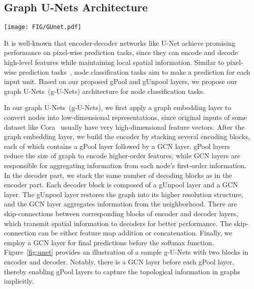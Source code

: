 \documentclass{article}
\begin{document}
\subsection{Graph U-Nets Architecture}\label{sec:gunet}

\begin{figure*}[t] \texttt{[image: FIG/GUnet.pdf]}
\caption{An illustration of the proposed graph U-Nets~(g-U-Nets). In
this example, each node in the input graph has two features. The
input feature vectors are transformed into low-dimensional
representations using a GCN layer. After that, we stack two encoder
blocks, each of which contains a gPool layer and a GCN layer. In the
decoder part, there are also two decoder blocks. Each block consists
of a gUnpool layer and a GCN layer. For blocks in the same level,
encoder block uses skip connection to fuse the low-level spatial
features from the encoder block. The output feature vectors of nodes
in the last layer are network embedding, which can be used for
various tasks such as node classification and link prediction. }
\label{fig:unet}
\end{figure*}

It is well-known that encoder-decoder networks like U-Net achieve
promising performance on pixel-wise prediction tasks, since they can
encode and decode high-level features while maintaining local
spatial information. Similar to pixel-wise prediction
tasks~\citep{gong2013deep,ronneberger2015u}, node classification
tasks aim to make a prediction for each input unit. Based on our
proposed gPool and gUnpool layers, we propose our graph
U-Nets~(g-U-Nets) architecture for node classification tasks.

In our graph U-Nets~(g-U-Nets), we first apply a graph embedding
layer to convert nodes into low-dimensional representations, since
original inputs of some dataset like Cora~\citep{sen2008collective}
usually have very high-dimensional feature vectors. After the graph
embedding layer, we build the encoder by stacking several encoding
blocks, each of which contains a gPool layer followed by a GCN
layer. gPool layers reduce the size of graph to encode higher-order
features, while GCN layers are responsible for aggregating
information from each node's first-order information. In the decoder
part, we stack the same number of decoding blocks as in the encoder
part. Each decoder block is composed of a gUnpool layer and a GCN
layer. The gUnpool layer restores the graph into its higher
resolution structure, and the GCN layer aggregates information from
the neighborhood. There are skip-connections between corresponding
blocks of encoder and decoder layers, which transmit spatial
information to decoders for better performance. The skip-connection
can be either feature map addition or concatenation. Finally, we
employ a GCN layer for final predictions before the softmax
function. Figure~\ref{fig:unet} provides an illustration of a sample
g-U-Nets with two blocks in encoder and decoder.
Notably, there is a GCN layer before each gPool layer, thereby
enabling gPool layers to capture the topological information in
graphs implicitly.
\end{document}
